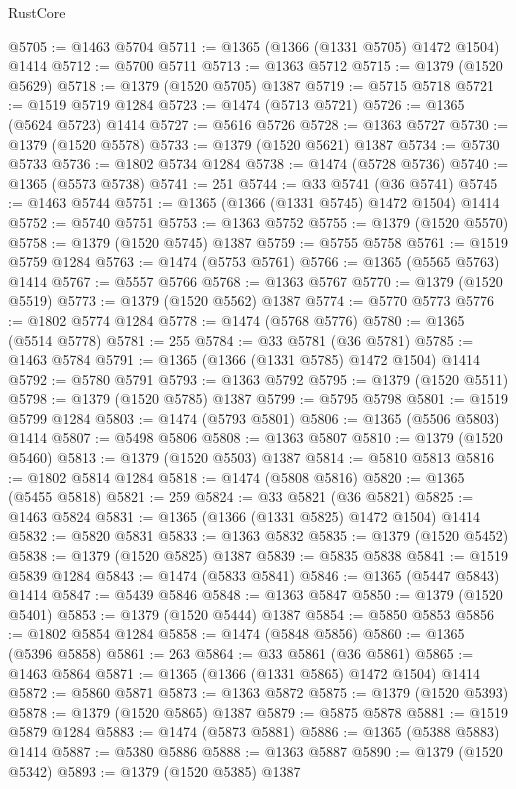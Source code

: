 \begin{lexlean}{RustCore}
\begin{coremodule}
@5705 := @1463 @5704
@5711 := @1365 (@1366 (@1331 @5705) @1472 @1504) @1414
@5712 := @5700 @5711
@5713 := @1363 @5712
@5715 := @1379 (@1520 @5629)
@5718 := @1379 (@1520 @5705) @1387
@5719 := @5715 @5718
@5721 := @1519 @5719 @1284
@5723 := @1474 (@5713 @5721)
@5726 := @1365 (@5624 @5723) @1414
@5727 := @5616 @5726
@5728 := @1363 @5727
@5730 := @1379 (@1520 @5578)
@5733 := @1379 (@1520 @5621) @1387
@5734 := @5730 @5733
@5736 := @1802 @5734 @1284
@5738 := @1474 (@5728 @5736)
@5740 := @1365 (@5573 @5738)
@5741 := 251
@5744 := @33 @5741 (@36 @5741)
@5745 := @1463 @5744
@5751 := @1365 (@1366 (@1331 @5745) @1472 @1504) @1414
@5752 := @5740 @5751
@5753 := @1363 @5752
@5755 := @1379 (@1520 @5570)
@5758 := @1379 (@1520 @5745) @1387
@5759 := @5755 @5758
@5761 := @1519 @5759 @1284
@5763 := @1474 (@5753 @5761)
@5766 := @1365 (@5565 @5763) @1414
@5767 := @5557 @5766
@5768 := @1363 @5767
@5770 := @1379 (@1520 @5519)
@5773 := @1379 (@1520 @5562) @1387
@5774 := @5770 @5773
@5776 := @1802 @5774 @1284
@5778 := @1474 (@5768 @5776)
@5780 := @1365 (@5514 @5778)
@5781 := 255
@5784 := @33 @5781 (@36 @5781)
@5785 := @1463 @5784
@5791 := @1365 (@1366 (@1331 @5785) @1472 @1504) @1414
@5792 := @5780 @5791
@5793 := @1363 @5792
@5795 := @1379 (@1520 @5511)
@5798 := @1379 (@1520 @5785) @1387
@5799 := @5795 @5798
@5801 := @1519 @5799 @1284
@5803 := @1474 (@5793 @5801)
@5806 := @1365 (@5506 @5803) @1414
@5807 := @5498 @5806
@5808 := @1363 @5807
@5810 := @1379 (@1520 @5460)
@5813 := @1379 (@1520 @5503) @1387
@5814 := @5810 @5813
@5816 := @1802 @5814 @1284
@5818 := @1474 (@5808 @5816)
@5820 := @1365 (@5455 @5818)
@5821 := 259
@5824 := @33 @5821 (@36 @5821)
@5825 := @1463 @5824
@5831 := @1365 (@1366 (@1331 @5825) @1472 @1504) @1414
@5832 := @5820 @5831
@5833 := @1363 @5832
@5835 := @1379 (@1520 @5452)
@5838 := @1379 (@1520 @5825) @1387
@5839 := @5835 @5838
@5841 := @1519 @5839 @1284
@5843 := @1474 (@5833 @5841)
@5846 := @1365 (@5447 @5843) @1414
@5847 := @5439 @5846
@5848 := @1363 @5847
@5850 := @1379 (@1520 @5401)
@5853 := @1379 (@1520 @5444) @1387
@5854 := @5850 @5853
@5856 := @1802 @5854 @1284
@5858 := @1474 (@5848 @5856)
@5860 := @1365 (@5396 @5858)
@5861 := 263
@5864 := @33 @5861 (@36 @5861)
@5865 := @1463 @5864
@5871 := @1365 (@1366 (@1331 @5865) @1472 @1504) @1414
@5872 := @5860 @5871
@5873 := @1363 @5872
@5875 := @1379 (@1520 @5393)
@5878 := @1379 (@1520 @5865) @1387
@5879 := @5875 @5878
@5881 := @1519 @5879 @1284
@5883 := @1474 (@5873 @5881)
@5886 := @1365 (@5388 @5883) @1414
@5887 := @5380 @5886
@5888 := @1363 @5887
@5890 := @1379 (@1520 @5342)
@5893 := @1379 (@1520 @5385) @1387

\end{coremodule}
\end{lexlean}
